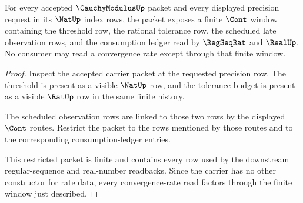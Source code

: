 \begin{theorem}
\label{thm:cauchymodulus-cont-window-closure}
For every accepted $\CauchyModulusUp$ packet and every displayed precision
request in its $\NatUp$ index rows, the packet exposes a finite $\Cont$ window
containing the threshold row, the rational tolerance row, the scheduled late
observation rows, and the consumption ledger read by $\RegSeqRat$ and
$\RealUp$. No consumer may read a convergence rate except through that finite
window.
\end{theorem}
\begin{proof}
Inspect the accepted carrier packet at the requested precision row. The
threshold is present as a visible $\NatUp$ row, and the tolerance budget is
present as a visible $\RatUp$ row in the same finite history.

The scheduled observation rows are linked to those two rows by the displayed
$\Cont$ routes. Restrict the packet to the rows mentioned by those routes and
to the corresponding consumption-ledger entries.

This restricted packet is finite and contains every row used by the downstream
regular-sequence and real-number readbacks. Since the carrier has no other
constructor for rate data, every convergence-rate read factors through the
finite window just described.
\end{proof}

